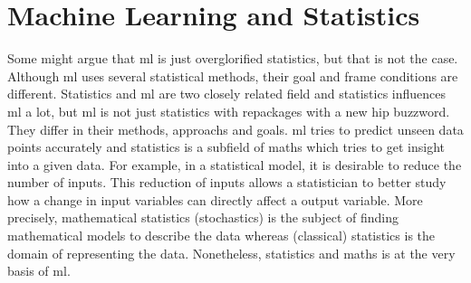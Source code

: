 \section{Machine Learning and Statistics}
Some might argue that \gls{ml} is just overglorified statistics, but that is not the case. 
Although \gls{ml} uses several statistical methods, their goal and frame conditions are different.
%
Statistics and \gls{ml} are two closely related field and statistics influences \gls{ml} a lot, but \gls{ml} is not just statistics with repackages with a new hip buzzword. 
They differ in their methods, approachs and goals. 
%
%
\Gls{ml} tries to predict unseen data points accurately and statistics is a subfield of maths which tries to get insight into a given data. 
For example, in a statistical model, it is desirable to reduce the number of inputs. 
This reduction of inputs allows a statistician to better study how a change in input variables can directly affect a output variable\cite{gontcharov2019}.
More precisely, mathematical statistics (stochastics)\cite{haertler2014statistisch} is the subject of finding mathematical models to describe the data whereas (classical) statistics is the domain of representing the data. 
Nonetheless, statistics and maths is at the very basis of \gls{ml}.

